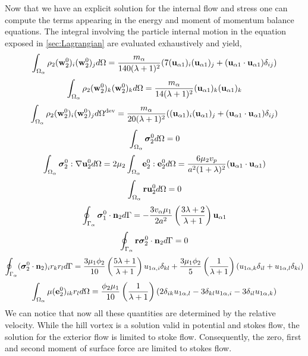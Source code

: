 Now that we have an explicit solution for the internal flow and stress one can compute the terms appearing in the energy and moment of momentum balance equations. 
The integral involving the particle internal motion in the equation exposed in \ref{sec:Lagrangian} are evaluated exhaustively and yield, 
\begin{equation*}
    \int_{\Omega_\alpha} \rho_2(\textbf{w}_2^0)_i (\textbf{w}_2^0)_j d\Omega
    = \frac{m_\alpha}{140 (\lambda +1)^2}
    (7 (\textbf{u}_{\alpha 1})_i(\textbf{u}_{\alpha 1})_j + (\textbf{u}_{\alpha 1}\cdot \textbf{u}_{\alpha 1})\delta_{ij})
\end{equation*} 
\begin{equation*}
    \int_{\Omega_\alpha} \rho_2(\textbf{w}_2^0)_k (\textbf{w}_2^0)_k d\Omega
    = \frac{m_\alpha}{14 (\lambda +1)^2}
     (\textbf{u}_{\alpha 1})_k(\textbf{u}_{\alpha 1})_k
\end{equation*} 
\begin{equation*}
    \int_{\Omega_\alpha} \rho_2(\textbf{w}_2^0)_i (\textbf{w}_2^0)_j d\Omega^\text{dev}
    = \frac{m_\alpha}{20 (\lambda +1)^2}
    ((\textbf{u}_{\alpha 1})_i(\textbf{u}_{\alpha 1})_j + (\textbf{u}_{\alpha 1}\cdot \textbf{u}_{\alpha 1})\delta_{ij})
\end{equation*} 
\begin{equation*}
    \int_{\Omega_\alpha} \bm\sigma_2^0 d\Omega
    = 0 
\end{equation*}
\begin{equation*}
    \int_{\Omega_\alpha} \bm{\sigma}_2^0:\mathbf{\nabla} \textbf{u}_2^0 d\Omega
    = 2\mu_2 \int_{\Omega_\alpha} \textbf{e}_2^0: \textbf{e}_2^0  d\Omega
    = 
    \frac{6 \mu_2 v_p}{a^2(1+\lambda)^2}
    (\textbf{u}_{\alpha 1}\cdot \textbf{u}_{\alpha 1})
\end{equation*}
\begin{align*}
    \int_{\Omega_\alpha} \textbf{r}\textbf{u}_2^0 d\Omega
    = 0 
\end{align*}
\begin{equation*}
    \oint_{\Gamma_\alpha} \bm\sigma_1^0\cdot \textbf{n}_2 d\Gamma
    = - \frac{3v_\alpha\mu_1}{2 a^2} 
    \left(\frac{3\lambda+2}{\lambda+1}\right) 
    \textbf{u}_{\alpha 1}
\end{equation*}
\begin{equation*}
    \oint_{\Gamma_\alpha} \textbf{r}\bm\sigma_2^0\cdot \textbf{n}_2 d\Gamma
    = 0 
\end{equation*}
\begin{equation*}
    \oint_{\Gamma_\alpha} (\bm\sigma_2^0\cdot \textbf{n}_2)_i r_kr_l d\Gamma
    = \frac{3\mu_1\phi_2}{10}\left(\frac{5\lambda+1}{\lambda+1}\right)u_{1 \alpha,i}\delta_{kl}
    + \frac{3\mu_1\phi_2}{5}\left(\frac{1}{\lambda+1}\right)(u_{1 \alpha,k}\delta_{il}+u_{1 \alpha,l}\delta_{ki})
\end{equation*}
\begin{equation*}
    \int_{\Omega_\alpha} \mu(\textbf{e}_2^0)_{ik} r_l d\Omega =
    \frac{\phi_2\mu_1}{10}\left(\frac{1}{\lambda+1}\right)
    \left(
        2\delta_{ik}u_{1 \alpha , l}
        -3\delta_{kl}u_{1 \alpha , i}
        -3\delta_{il}u_{1 \alpha , k}
    \right)
\end{equation*}
We can notice that now all these quantities are determined by the relative velocity.  
While the hill vortex is a solution valid in potential and stokes flow, the solution for the exterior flow is limited to stoke flow. 
Consequently, the zero, first and second moment of surface force are limited to stokes flow. 

